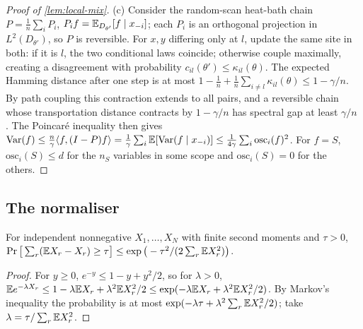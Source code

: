 \begin{proof}[Proof of \cref{lem:local-mix}]
(c) Consider the random-scan heat-bath chain $P=\frac1n\sum_iP_i$, $P_if=\mathbb{E}_{D_{\theta'}}[f\mid
x_{-i}]$; each $P_i$ is an orthogonal projection in $L^2(D_{\theta'})$, so $P$ is reversible. For
$x,y$ differing only at $l$, update the same site in both: if it is $l$, the two conditional
laws coincide; otherwise couple maximally, creating a disagreement with probability
$c_{il}(\theta')\le\kappa_{il}(\theta)$. The expected Hamming distance after one step is at most
$1-\frac1n+\frac1n\sum_{i\ne l}\kappa_{il}(\theta)\le1-\gamma/n$. By path coupling
\cite{bubleydyer1997} this contraction extends to all pairs, and a reversible chain whose
transportation distance contracts by $1-\gamma/n$ has spectral gap at least $\gamma/n$
\cite[Section~13.1]{lpw2017}. The Poincar\'e inequality then gives
$\mathrm{Var}(f)\le\frac n\gamma\langle f,(I-P)f\rangle=\frac1\gamma\sum_i\mathbb{E}[\mathrm{Var}(f\mid x_{-i})]\le
\frac1{4\gamma}\sum_i\mathrm{osc}_i(f)^2$. For $f=S$, $\mathrm{osc}_i(S)\le d$ for the $n_S$ variables
in some scope and $\mathrm{osc}_i(S)=0$ for the others.
\end{proof}

\subsection{The normaliser}

\begin{lemma}\label{lem:maurer}
For independent nonnegative $X_1,\dots,X_N$ with finite second moments and $\tau>0$,
$\Pr\big[\sum_r(\mathbb{E} X_r-X_r)\ge\tau\big]\le\exp\big(-\tau^2/(2\sum_r\mathbb{E} X_r^2)\big)$.
\end{lemma}

\begin{proof}
For $y\ge0$, $e^{-y}\le1-y+y^2/2$, so for $\lambda>0$,
$\mathbb{E} e^{-\lambda X_r}\le1-\lambda\mathbb{E} X_r+\lambda^2\mathbb{E} X_r^2/2\le\exp(-\lambda\mathbb{E} X_r+\lambda^2\mathbb{E} X_r^2/2)$.
By Markov's inequality the probability is at most
$\exp(-\lambda\tau+\lambda^2\sum_r\mathbb{E} X_r^2/2)$; take $\lambda=\tau/\sum_r\mathbb{E} X_r^2$.
\end{proof}

